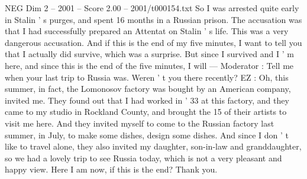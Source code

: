 \begin{textsample}{NEG Dim 2 – 2001 – Score 2.00 – 2001/t000154.txt}
So I was arrested quite early in Stalin ' s purges, and spent 16 months in a Russian prison.
The accusation was that I had successfully prepared an Attentat on Stalin ' s life.
This was a very dangerous accusation.
And if this is the end of my five minutes, I want to tell you that I actually did survive, which was a surprise.
But since I survived and I ' m here, and since this is the end of the five minutes, I will — Moderator : Tell me when your last trip to Russia was.
Weren ' t you there recently?
EZ : Oh, this summer, in fact, the Lomonosov factory was bought by an American company, invited me.
They found out that I had worked in ' 33 at this factory, and they came to my studio in Rockland County, and brought the 15 of their artists to visit me here.
And they invited myself to come to the Russian factory last summer, in July, to make some dishes, design some dishes.
And since I don ' t like to travel alone, they also invited my daughter, son-in-law and granddaughter, so we had a lovely trip to see Russia today, which is not a very pleasant and happy view.
Here I am now, if this is the end?
Thank you.

\end{textsample}
